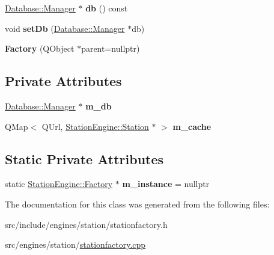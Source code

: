 \begin{DoxyCompactItemize}
\mbox{\hyperlink{classDatabase_1_1Manager}{Database\+::\+Manager}} $\ast$ {\bfseries db} () const
\item 
\mbox{\label{classStationEngine_1_1Factory_a12aaa48831c5baed1f1d275c4a812546}} 
void {\bfseries set\+Db} (\mbox{\hyperlink{classDatabase_1_1Manager}{Database\+::\+Manager}} $\ast$db)
\item 
\mbox{\label{classStationEngine_1_1Factory_a5171ed076e2b451562a5a8483f875e2b}} 
{\bfseries Factory} (Q\+Object $\ast$parent=nullptr)
\end{DoxyCompactItemize}
\subsection*{Private Attributes}
\begin{DoxyCompactItemize}
\item 
\mbox{\label{classStationEngine_1_1Factory_a5e37413b221a5ef8aeec50adc239029a}} 
\mbox{\hyperlink{classDatabase_1_1Manager}{Database\+::\+Manager}} $\ast$ {\bfseries m\+\_\+db}
\item 
\mbox{\label{classStationEngine_1_1Factory_ae267ebb3f7372f61420ff91475204a21}} 
Q\+Map$<$ Q\+Url, \mbox{\hyperlink{classStationEngine_1_1Station}{Station\+Engine\+::\+Station}} $\ast$ $>$ {\bfseries m\+\_\+cache}
\end{DoxyCompactItemize}
\subsection*{Static Private Attributes}
\begin{DoxyCompactItemize}
\item 
\mbox{\label{classStationEngine_1_1Factory_ab38580988730892e9d2c1553b491609a}} 
static \mbox{\hyperlink{classStationEngine_1_1Factory}{Station\+Engine\+::\+Factory}} $\ast$ {\bfseries m\+\_\+instance} = nullptr
\end{DoxyCompactItemize}


The documentation for this class was generated from the following files\+:\begin{DoxyCompactItemize}
\item 
src/include/engines/station/stationfactory.\+h\item 
src/engines/station/\mbox{\hyperlink{stationfactory_8cpp}{stationfactory.\+cpp}}\end{DoxyCompactItemize}
